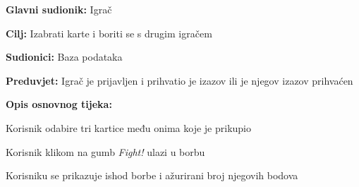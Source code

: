 					\noindent {}
					\begin{packed_item}
	
						\item \textbf{Glavni sudionik: }Igrač
						\item  \textbf{Cilj:} Izabrati karte i boriti se s drugim igračem
						\item  \textbf{Sudionici:} Baza podataka
						\item  \textbf{Preduvjet:} Igrač je prijavljen i prihvatio je izazov ili je njegov izazov prihvaćen
						\item  \textbf{Opis osnovnog tijeka:}
						
						\item[] \begin{packed_enum}
	
							\item Korisnik odabire tri kartice među onima koje je prikupio
							\item Korisnik klikom na gumb \textit{Fight!} ulazi u borbu
							\item Korisniku se prikazuje ishod borbe i ažurirani broj njegovih bodova
						\end{packed_enum}
						
					\end{packed_item}
					
